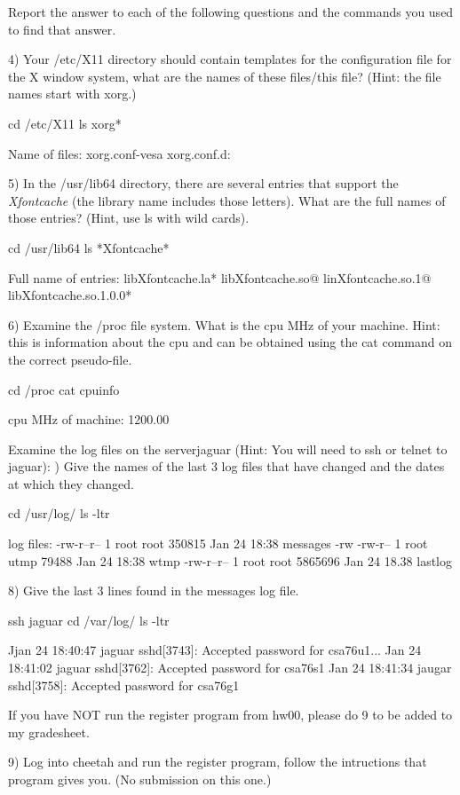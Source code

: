 Report the answer to each of the following questions and the
commands you used to find that answer.

4) Your {\ltt{}/etc/X11} directory should contain templates for
the configuration file for the {\ltt{}X} window system,
what are the names of these files/this file?
(Hint: the file names start with xorg.)

cd /etc/X11
ls xorg*

Name of files:
xorg.conf-vesa
xorg.conf.d:

5) In the {\ltt{}/usr/lib64} directory, there are several entries that support
the {\it Xfontcache} (the library name includes those letters). What are the
full names of those entries?
(Hint, use ls with wild cards).

cd /usr/lib64
ls *Xfontcache*

Full name of entries: 
libXfontcache.la*
libXfontcache.so@
linXfontcache.so.1@
libXfontcache.so.1.0.0*

6) Examine the {\ltt{}/proc} file system.
What is the cpu MHz of your machine.
Hint: this is information about the cpu and can be obtained using the
cat command on the correct pseudo-file.

cd /proc
cat cpuinfo

cpu MHz of machine: 1200.00

Examine the log files on the server{\ltt{}jaguar} (Hint: You will
need to ssh or telnet to jaguar):
\hfill{}) Give the names of the last 3 log files that have changed and 
the dates at which they changed.
\hfill\break

cd /usr/log/
ls -ltr

log files:
-rw-r--r-- 1 root root 350815 Jan 24 18:38 messages
-rw -rw-r-- 1 root utmp 79488 Jan 24 18:38 wtmp
-rw-r--r-- 1 root root 5865696 Jan 24 18.38 lastlog


8) Give the last 3 lines found in the {\ltt{}messages} log file.

ssh jaguar
cd /var/log/
ls -ltr

Jjan 24 18:40:47 jaguar sshd[3743]: Accepted password for csa76u1...
Jan 24 18:41:02 jaguar sshd[3762]: Accepted password for csa76s1
Jan 24 18:41:34 jaugar sshd[3758]: Accepted password for csa76g1

If you have NOT run the register program from hw00, please do 9 to
be added to my gradesheet.

9) Log into {\ltt{}cheetah} and run the {\ltt{}register} program,
follow the intructions that program gives you.
(No submission on this one.)

\bye
